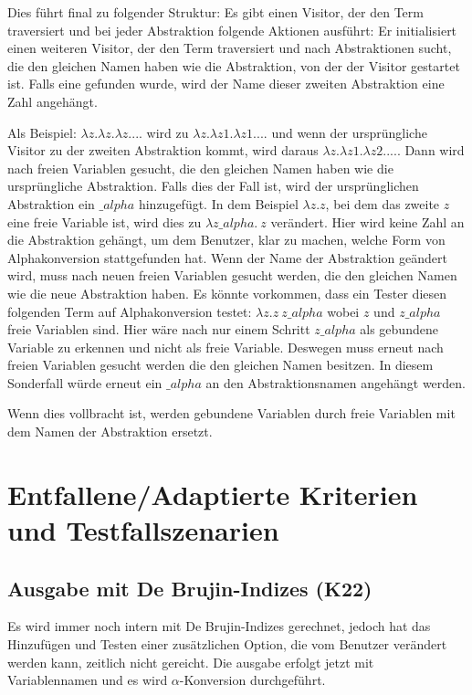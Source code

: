 \documentclass[parskip=full,11pt,twoside]{scrartcl}
\begin{document}
{        Dies führt final zu folgender Struktur:
           Es gibt einen Visitor, der den Term traversiert und bei jeder Abstraktion folgende Aktionen ausführt:
           Er initialisiert einen weiteren Visitor, der den Term traversiert und nach Abstraktionen sucht, die den gleichen Namen haben wie die Abstraktion,
            von der der Visitor gestartet ist.
        Falls eine gefunden wurde, wird der Name dieser zweiten Abstraktion eine Zahl angehängt.
        
        Als Beispiel: $\lambda z. \lambda z. \lambda z. ...$ wird zu $\lambda z. \lambda z1. \lambda z1. ...$
            und wenn der ursprüngliche Visitor zu der zweiten Abstraktion kommt, wird daraus $\lambda z. \lambda z1. \lambda z2. ...$.
           Dann wird nach freien Variablen gesucht, die den gleichen Namen haben wie die ursprüngliche Abstraktion.
        Falls dies der Fall ist, wird der ursprünglichen Abstraktion ein $\_ alpha$ hinzugefügt.
        In dem Beispiel $\lambda z. z$, bei dem das zweite $z$ eine freie Variable ist, wird dies zu $\lambda z \_ alpha. \  z$ verändert.
           Hier wird keine Zahl an die Abstraktion gehängt, um dem Benutzer, klar zu machen, welche Form von Alphakonversion stattgefunden hat.
           Wenn der Name der Abstraktion geändert wird, muss  nach neuen freien Variablen gesucht werden, die den gleichen Namen wie die neue Abstraktion haben.
        Es könnte vorkommen, dass ein Tester diesen folgenden Term auf Alphakonversion testet:
            $\lambda z. z \ z\_ alpha$ wobei $z$ und $z\_ alpha$ freie Variablen sind.
           Hier wäre nach nur einem Schritt $z\_ alpha$ als gebundene Variable zu erkennen und nicht als freie Variable.
           Deswegen muss erneut nach freien Variablen gesucht werden die den gleichen Namen besitzen.
           In diesem Sonderfall würde erneut ein $\_ alpha$ an den Abstraktionsnamen angehängt werden.
           
           Wenn dies vollbracht ist, werden gebundene Variablen durch freie Variablen mit dem Namen der Abstraktion ersetzt.
}

\section{Entfallene/Adaptierte Kriterien und Testfallszenarien}
\subsection{Ausgabe mit De Brujin-Indizes (K22)}
    Es wird immer noch intern mit De Brujin-Indizes gerechnet, jedoch hat das Hinzufügen und Testen einer zusätzlichen Option,
        die vom Benutzer verändert werden kann, zeitlich nicht gereicht.
    Die ausgabe erfolgt jetzt mit Variablennamen und es wird $\alpha$-Konversion durchgeführt.
\end{document}
